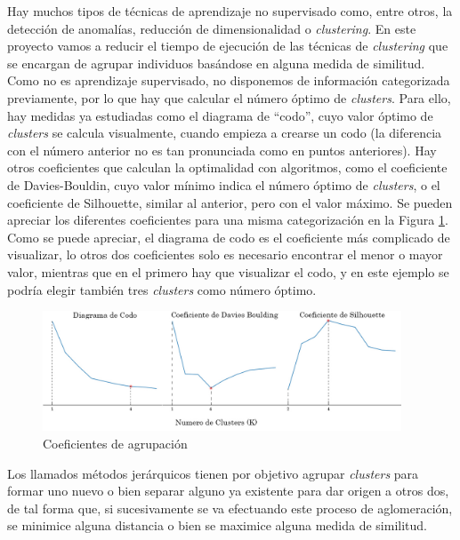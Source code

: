 	Hay muchos tipos de técnicas de aprendizaje no supervisado como, entre otros, la detección de anomalías, reducción de dimensionalidad o \textit{clustering}. En este proyecto vamos a reducir el tiempo de ejecución de las técnicas de \textit{clustering} que se encargan de agrupar individuos basándose en alguna medida de similitud. Como no es aprendizaje supervisado, no disponemos de información categorizada previamente, por lo que hay que calcular el número óptimo de \textit{clusters}. Para ello, hay medidas ya estudiadas como el diagrama de ``codo'', cuyo valor óptimo de \textit{clusters} se calcula visualmente, cuando empieza a crearse un codo (la diferencia con el número anterior no es tan pronunciada como en puntos anteriores). Hay otros coeficientes que calculan la optimalidad con algoritmos, como el coeficiente de Davies-Bouldin, cuyo valor mínimo indica el número óptimo de \textit{clusters}, o el coeficiente de Silhouette, similar al anterior, pero con el valor máximo. Se pueden apreciar los diferentes coeficientes para una misma categorización en la Figura \ref{fig:coeficientes}. Como se puede apreciar, el diagrama de codo es el coeficiente más complicado de visualizar, lo otros dos coeficientes solo es necesario encontrar el menor o mayor valor, mientras que en el primero hay que visualizar el codo, y en este ejemplo se podría elegir también tres \textit{clusters} como número óptimo.


	\begin{figure}[!h]
		\centering
		\includegraphics[width=0.95\textwidth]{images/chapter_2/ap_nosup_diagramas}
		\caption{Coeficientes de agrupación}
		\label{fig:coeficientes}
	\end{figure}
	


	Los llamados métodos jerárquicos \cite{ackermann2014analysis} tienen por objetivo agrupar \textit{clusters} para formar uno nuevo o bien separar alguno ya existente para dar origen a otros dos, de tal forma que, si sucesivamente se va efectuando este proceso de aglomeración, se minimice alguna distancia o bien se maximice alguna medida de similitud.
	
